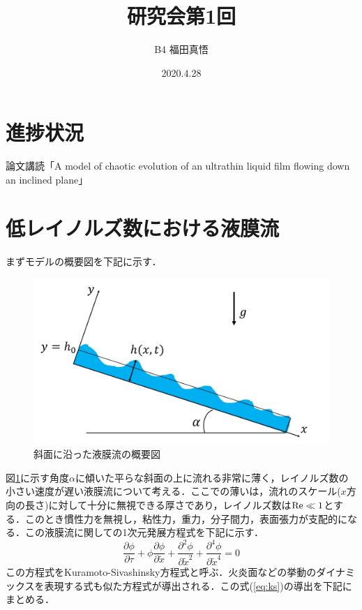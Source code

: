\documentclass[autodetect-engine,dvipdfmx-if-dvi,ja=standard,a4paper,11pt]{bxjsarticle} %
\title{研究会第1回} %
\author{B4 福田真悟} %
\date{2020.4.28}%
\begin{document}
\maketitle %
\section{進捗状況}%
論文講読「A model of chaotic evolution of an ultrathin liquid film flowing down an inclined plane」
\section{低レイノルズ数における液膜流}
まずモデルの概要図を下記に示す．
\begin{figure}[H]%
\begin{center}
\includegraphics[width=.6\textwidth]{aboutNEW.jpg} 
\end{center}
\caption{斜面に沿った液膜流の概要図}%
\label{fig:about}%
\end{figure}
図\ref{fig:about}に示す角度$\alpha$に傾いた平らな斜面の上に流れる非常に薄く，レイノルズ数の小さい速度が遅い液膜流について考える．ここでの薄いは，流れのスケール($x$方向の長さ)に対して十分に無視できる厚さであり，レイノルズ数は${\rm Re}\ll1$とする．このとき慣性力を無視し，粘性力，重力，分子間力，表面張力が支配的になる．この液膜流に関しての1次元発展方程式を下記に示す．
\begin{equation}
\frac{\partial\phi}{\partial\tau}+\phi\frac{\partial\phi}{\partial\tilde{x}}+\frac{\partial^2\phi}{\partial\tilde{x}^2}+\frac{\partial^4\phi}{\partial\tilde{x}^4}=0
\label{eq:ks}
\end{equation}
この方程式をKuramoto-Sivashinsky方程式と呼ぶ．火炎面などの挙動のダイナミックスを表現する式も似た方程式が導出される．この式(\ref{eq:ks})の導出を下記にまとめる．
\end{document}
